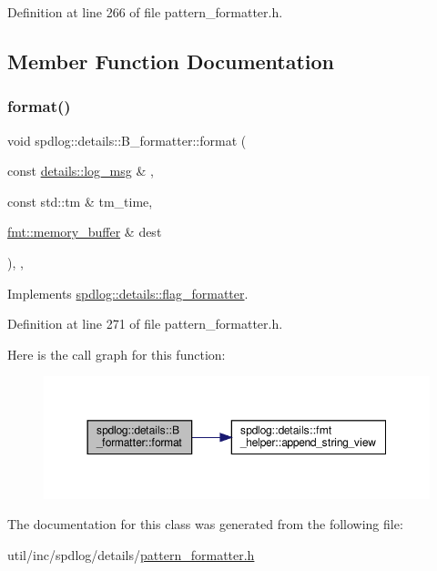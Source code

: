 Definition at line 266 of file pattern\+\_\+formatter.\+h.



\subsection{Member Function Documentation}
\mbox{\label{classspdlog_1_1details_1_1_b__formatter_a5f17328272b26d5d107e59bad150fac8}} 
\subsubsection{\texorpdfstring{format()}{format()}}
{\footnotesize\ttfamily void spdlog\+::details\+::\+B\+\_\+formatter\+::format (\begin{DoxyParamCaption}\item[{const \hyperlink{structspdlog_1_1details_1_1log__msg}{details\+::log\+\_\+msg} \&}]{,  }\item[{const std\+::tm \&}]{tm\+\_\+time,  }\item[{\hyperlink{format_8h_a21cbf729f69302f578e6db21c5e9e0d2}{fmt\+::memory\+\_\+buffer} \&}]{dest }\end{DoxyParamCaption})\hspace{0.3cm}{\ttfamily [inline]}, {\ttfamily [override]}, {\ttfamily [virtual]}}



Implements \hyperlink{classspdlog_1_1details_1_1flag__formatter_a33fb3e42a4c8200cceb833d92b53fb67}{spdlog\+::details\+::flag\+\_\+formatter}.



Definition at line 271 of file pattern\+\_\+formatter.\+h.

Here is the call graph for this function\+:
\nopagebreak
\begin{figure}[H]
\begin{center}
\leavevmode
\includegraphics[width=350pt]{classspdlog_1_1details_1_1_b__formatter_a5f17328272b26d5d107e59bad150fac8_cgraph}
\end{center}
\end{figure}


The documentation for this class was generated from the following file\+:\begin{DoxyCompactItemize}
\item 
util/inc/spdlog/details/\hyperlink{pattern__formatter_8h}{pattern\+\_\+formatter.\+h}\end{DoxyCompactItemize}
